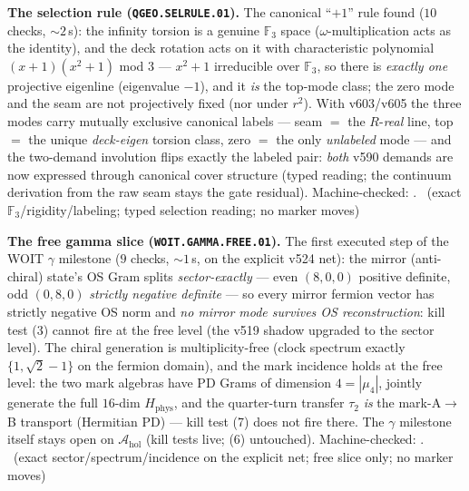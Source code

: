 \par\smallskip\noindent\textbf{The selection rule
(\texttt{QGEO.SELRULE.01}).}
The canonical ``$+1$'' rule found ($10$ checks, ${\sim}2$\,s): the
infinity torsion is a genuine $\mathbb{F}_3$ space
($\omega$-multiplication acts as the identity), and the deck rotation
acts on it with characteristic polynomial $(x+1)(x^2+1)$ mod $3$ ---
$x^2+1$ irreducible over $\mathbb{F}_3$, so there is \emph{exactly
one} projective eigenline (eigenvalue $-1$), and it \emph{is} the
top-mode class; the zero mode and the seam are not projectively fixed
(nor under $r^2$).  With v603/v605 the three modes carry mutually
exclusive canonical labels --- seam $=$ the $R$-\emph{real} line, top
$=$ the unique \emph{deck-eigen} torsion class, zero $=$ the only
\emph{unlabeled} mode --- and the two-demand involution flips exactly
the labeled pair: \emph{both} v590 demands are now expressed through
canonical cover structure (typed reading; the continuum derivation
from the raw seam stays the gate residual).
Machine-checked: .
\mE\ (exact $\mathbb{F}_3$/rigidity/labeling; typed selection
reading; no marker moves)
\par\smallskip

\par\smallskip\noindent\textbf{The free gamma slice
(\texttt{WOIT.GAMMA.FREE.01}).}
The first executed step of the WOIT $\gamma$ milestone ($9$ checks,
${\sim}1$\,s, on the explicit v524 net): the mirror (anti-chiral)
state's OS Gram splits \emph{sector-exactly} --- even $(8,0,0)$
positive definite, odd $(0,8,0)$ \emph{strictly negative definite}
--- so every mirror fermion vector has strictly negative OS norm and
\emph{no mirror mode survives OS reconstruction}: kill test (3)
cannot fire at the free level (the v519 shadow upgraded to the
sector level).  The chiral generation is multiplicity-free (clock
spectrum exactly $\{1,\sqrt2-1\}$ on the fermion domain), and the
mark incidence holds at the free level: the two mark algebras have
PD Grams of dimension $4=|\mu_4|$, jointly generate the full
$16$-dim $H_{\mathrm{phys}}$, and the quarter-turn transfer
$\tau_2$ \emph{is} the mark-A$\to$B transport (Hermitian PD) ---
kill test (7) does not fire there.  The $\gamma$ milestone itself
stays open on $\mathcal A_{\mathrm{hol}}$ (kill tests live; (6)
untouched).
Machine-checked: .
\mE\ (exact sector/spectrum/incidence on the explicit net; free
slice only; no marker moves)
\par\smallskip

